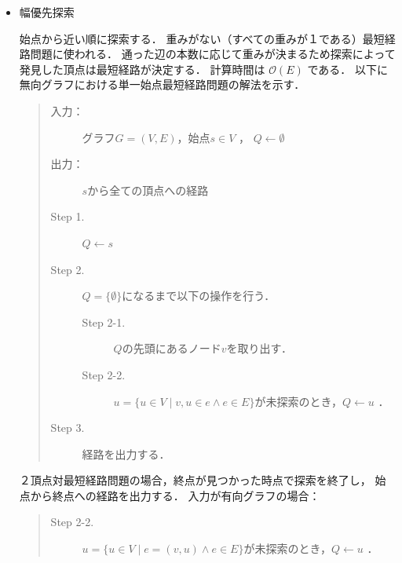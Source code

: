 \documentclass[12pt]{optlab-bachelor}
\begin{document}
\begin{itemize}
  \item 幅優先探索

  始点から近い順に探索する．
  重みがない（すべての重みが１である）最短経路問題に使われる．
  通った辺の本数に応じて重みが決まるため探索によって発見した頂点は最短経路が決定する．
  計算時間は $\mathcal{\mathcal{O}}(E)$ である．
  以下に無向グラフにおける単一始点最短経路問題の解法を示す．

  \begin{quote}
    \begin{description}
      \item[入力：] グラフ$G=(V,E)$，始点$s \in V$ ， $Q \leftarrow \emptyset$
      \item[出力：] $s$から全ての頂点への経路
      \item[Step 1.] $Q \leftarrow s$
      \item[Step 2.] $Q = \{\emptyset\}$になるまで以下の操作を行う．
      \begin{description}
        \item[Step 2-1.] $Q$の先頭にあるノード$v$を取り出す．
        \item[Step 2-2.] $u = \{u \in V \mid v,u \in e \land e \in E\}$が未探索のとき，$Q \leftarrow u$ ．
      \end{description}

      \item[Step 3.] 経路を出力する．
    \end{description}
  \end{quote}
  ２頂点対最短経路問題の場合，終点が見つかった時点で探索を終了し，
  始点から終点への経路を出力する．
  入力が有向グラフの場合：
  \begin{quote}
    \begin{description}
      \item[Step 2-2.] $u = \{u \in V \mid e = (v,u) \land e \in E\}$が未探索のとき，$Q \leftarrow u$ ．
    \end{description}
  \end{quote}
\end{itemize}
\end{document}
